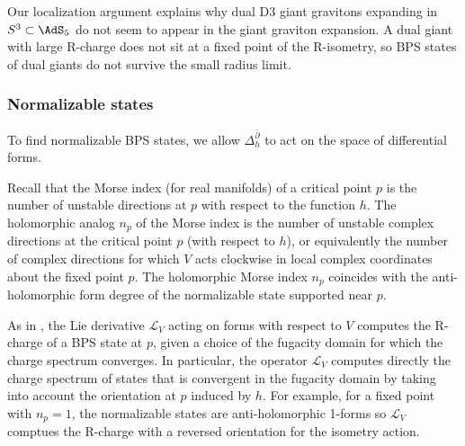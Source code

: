 \documentclass[a4paper,12pt]{article}
\begin{document}
Our localization argument explains why dual D3 giant gravitons expanding in $S^3 \subset \AdS_5$ do not seem to appear in the giant graviton expansion. A dual giant with large R-charge does not sit at a fixed point of the R-isometry, so BPS states of dual giants do not survive the small radius limit.


\subsubsection{Normalizable states} \label{subsubsec:normalizablestates}

To find normalizable BPS states, we allow $\Delta_h^{\bar\partial}$ to act on the space of differential forms.

Recall that the Morse index (for real manifolds) of a critical point $p$ is the number of unstable directions at $p$ with respect to the function $h$. The holomorphic analog $n_p$ of the Morse index \cite{Witten:1984hol} is the number of unstable complex directions at the critical point $p$ (with respect to $h$), or equivalently the number of complex directions for which $V$ acts clockwise in local complex coordinates about the fixed point $p$. The holomorphic Morse index $n_p$ coincides with the anti-holomorphic form degree of the normalizable state supported near $p$.

As in \cite{Witten:1984hol}, the Lie derivative $\mathcal{L}_V$ acting on forms with respect to $V$ computes the R-charge of a BPS state at $p$, given a choice of the fugacity domain for which the charge spectrum converges. In particular, the operator $\mathcal{L}_V$ computes directly the charge spectrum of states that is convergent in the fugacity domain by taking into account the orientation at $p$ induced by $h$. For example, for a fixed point with $n_p=1$, the normalizable states are anti-holomorphic 1-forms so $\mathcal{L}_V$ comptues the R-charge with a reversed orientation for the isometry action. 
\end{document}
